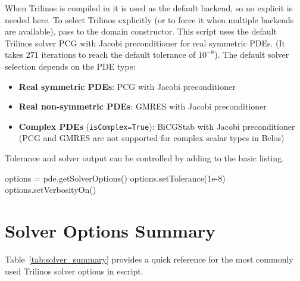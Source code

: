 When Trilinos is compiled in it is used as the default backend, so no explicit  is needed here.
To select Trilinos explicitly (or to force it when multiple backends are available), pass
 to the domain constructor.
This script uses the default Trilinos solver PCG with Jacobi preconditioner for real symmetric PDEs.
(It takes 271 iterations to reach the default tolerance of $10^{-8}$).
The default solver selection depends on the PDE type:
\begin{itemize}
  \item \textbf{Real symmetric PDEs}: PCG with Jacobi preconditioner
  \item \textbf{Real non-symmetric PDEs}: GMRES with Jacobi preconditioner
  \item \textbf{Complex PDEs} (\verb|isComplex=True|): BiCGStab with Jacobi preconditioner
    (PCG and GMRES are not supported for complex scalar types in Belos)
\end{itemize}
Tolerance and solver output can be controlled by adding to the basic listing.
 \begin{python}[caption=tolerance , label=tolerance ]
options = pde.getSolverOptions()  
options.setTolerance(1e-8)        
options.setVerbosityOn()        
\end{python}



\section{Solver Options Summary}
Table~\ref{tab:solver_summary} provides a quick reference for the most commonly used Trilinos solver options in escript.

